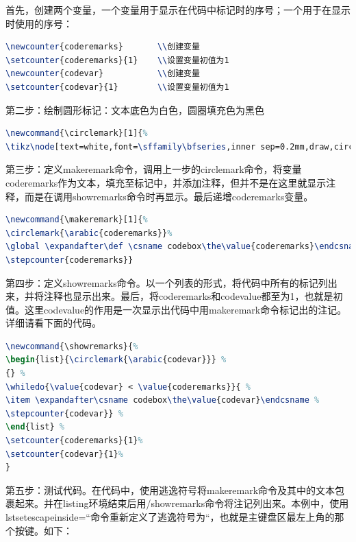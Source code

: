\documentclass{book}
\newcounter{coderemarks}   %
\newcounter{codevar}     %
\newcommand{\circlemark}[1]{%
\tikz\node[text=white,font=\sffamily\bfseries,inner sep=0.2mm,draw,circle,fill=black]{#1};}
\newcommand{\makeremark}[1]{%
\circlemark{\arabic{coderemarks}}%
\global \expandafter\def \csname codebox\the\value{coderemarks}\endcsname{#1}%
\stepcounter{coderemarks}}
\newcommand{\showremarks}{%
\begin{list}{\circlemark{\arabic{codevar}}} %
{} %
\whiledo{\value{codevar} < \value{coderemarks}}{ %
\item \expandafter\csname codebox\the\value{codevar}\endcsname %
\stepcounter{codevar}} %
\end{list} %
\setcounter{coderemarks}{1}%
\setcounter{codevar}{1}%
}
\begin{document}
首先，创建两个变量，一个变量用于显示在代码中标记时的序号；一个用于在显示时使用的序号：

\begin{lstlisting}[language=TeX]
\newcounter{coderemarks}       \\创建变量
\setcounter{coderemarks}{1}    \\设置变量初值为1
\newcounter{codevar}           \\创建变量
\setcounter{codevar}{1}        \\设置变量初值为1
\end{lstlisting}

 

第二步：绘制圆形标记：文本底色为白色，圆圈填充色为黑色

\begin{lstlisting}[language=TeX]
\newcommand{\circlemark}[1]{%
\tikz\node[text=white,font=\sffamily\bfseries,inner sep=0.2mm,draw,circle,fill=black]{#1};}
\end{lstlisting} 

第三步：定义makeremark命令，调用上一步的circlemark命令，将变量coderemarks作为文本，填充至标记中，并添加注释，但并不是在这里就显示注释，而是在调用showremarks命令时再显示。最后递增coderemarks变量。

\begin{lstlisting}[language=TeX]
\newcommand{\makeremark}[1]{%
\circlemark{\arabic{coderemarks}}%
\global \expandafter\def \csname codebox\the\value{coderemarks}\endcsname{#1}%
\stepcounter{coderemarks}}
\end{lstlisting} 

第四步：定义showremarks命令。以一个列表的形式，将代码中所有的标记列出来，并将注释也显示出来。最后，将coderemarks和codevalue都至为1，也就是初值。这里codevalue的作用是一次显示出代码中用makeremark命令标记出的注记。详细请看下面的代码。

\begin{lstlisting}[language=TeX]
\newcommand{\showremarks}{%
\begin{list}{\circlemark{\arabic{codevar}}} %
{} %
\whiledo{\value{codevar} < \value{coderemarks}}{ %
\item \expandafter\csname codebox\the\value{codevar}\endcsname %
\stepcounter{codevar}} %
\end{list} %
\setcounter{coderemarks}{1}%
\setcounter{codevar}{1}%
}
\end{lstlisting}

第五步：测试代码。在代码中，使用逃逸符号将makeremark命令及其中的文本包裹起来。并在listing环境结束后用/showremarks命令将注记列出来。本例中，使用lstset{escapeinside=``}命令重新定义了逃逸符号为``，也就是主键盘区最左上角的那个按键。如下：
\end{document}
